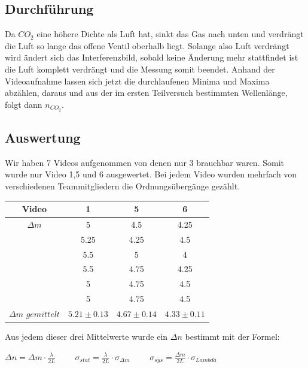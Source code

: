 \documentclass[a4paper, 11pt]{article}
\begin{document}
\subsection{Durchführung}
Da $CO_2$ eine höhere Dichte als Luft hat, sinkt das Gas nach unten und verdrängt die Luft so lange das offene Ventil oberhalb liegt. Solange also Luft verdrängt wird ändert sich das Interferenzbild, sobald keine Änderung mehr stattfindet ist die Luft komplett verdrängt und die Messung somit beendet. Anhand der Videoaufnahme lassen sich jetzt die durchlaufenen Minima und Maxima abzählen, daraus und aus der im ersten Teilversuch bestimmten Wellenlänge, folgt dann $n_{CO_2}$.
\subsection{Auswertung}
Wir haben 7 Videos aufgenommen von denen nur 3 brauchbar waren. Somit wurde nur Video 1,5 und 6 ausgewertet. Bei jedem Video wurden mehrfach von verschiedenen Teammitgliedern die Ordnungsübergänge gezählt.\newline
\begin{tabular}{|c|c|c|c|}
\hline Video&1 &5 &6\\
\hline $\Delta m$&5&4.5&4.25 \\
$  $  &5.25& 4.25 &4.5\\
$ $& 5.5&5&4\\
$ $& 5.5&4.75&4.25\\
$  $& 5&4.75&4.5\\
$  $&5&4.75&4.5\\
\hline $\Delta m$ $ gemittelt$& $5.21 \pm 0.13$&$4.67 \pm 0.14$&$4.33 \pm 0.11$ \\
\hline
\end{tabular}

Aus jedem dieser drei Mittelwerte wurde ein $\Delta n$ bestimmt mit der Formel:
\begin{center}
$\Delta n=\Delta m \cdot \frac{\lambda}{2L}$ $\;\;\;\;\;\;$ $\sigma_{stat}=\frac{\lambda}{2L}\cdot \sigma_{\Delta m}$ $\;\;\;\;\;\; $ $\sigma_{sys}=\frac{\Delta m}{2L}\cdot \sigma_{Lambda}$
\end{center}
\end{document}
